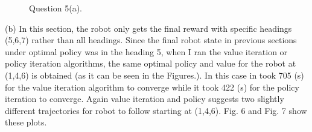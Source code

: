 \documentclass{article}
\begin{document}
\begin{figure}[h!]
\begin{minipage}{0.4\textwidth}
	\end{minipage}
	
	\caption{Question 5(a).}
	\label{fig:globfig}
\end{figure}	
	
	\newpage
	\newpage
	(b) 	
	In this section, the robot only gets the final reward with specific headings (5,6,7) rather than all headings. Since the final robot state in previous sections under optimal policy was in the heading 5, when I ran the value iteration or policy iteration algorithms, the same optimal policy and value for the robot at (1,4,6) is obtained (as it can be seen in the Figures.). In this case in took 705 (s) for the value iteration algorithm to converge while it took 422 (s) for the policy iteration to converge. Again value iteration and policy suggests two slightly different trajectories for robot to follow starting at (1,4,6). Fig. 6 and Fig. 7 show these plots. 
	
\end{document}
